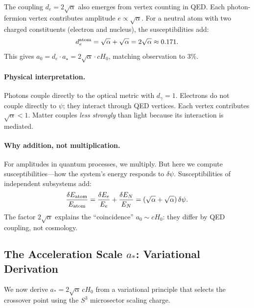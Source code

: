 \begin{remark}\label{rem:two-vertex}
The coupling $d_e = 2\sqrt{\alpha}$ also emerges from vertex counting in QED. Each photon-fermion vertex contributes amplitude $e \propto \sqrt{\alpha}$. For a neutral atom with two charged constituents (electron and nucleus), the susceptibilities add:
\begin{equation}
d_e^{\rm atom} = \sqrt{\alpha} + \sqrt{\alpha} = 2\sqrt{\alpha} \approx 0.171.
\end{equation}
This gives $a_0 = d_e \cdot a_\star = 2\sqrt{\alpha} \cdot cH_0$, matching observation to 3\%.

\paragraph{Physical interpretation.}
Photons couple directly to the optical metric with $d_\gamma = 1$. Electrons do not couple directly to $\psi$; they interact through QED vertices. Each vertex contributes $\sqrt{\alpha} < 1$. Matter couples \textit{less strongly} than light because its interaction is mediated.

\paragraph{Why addition, not multiplication.}
For amplitudes in quantum processes, we multiply. But here we compute susceptibilities---how the system's energy responds to $\delta\psi$. Susceptibilities of independent subsystems add:
\begin{equation}
\frac{\delta E_{\rm atom}}{E_{\rm atom}} = \frac{\delta E_e}{E_e} + \frac{\delta E_N}{E_N} = (\sqrt{\alpha} + \sqrt{\alpha})\,\delta\psi.
\end{equation}
The factor $2\sqrt{\alpha}$ explains the ``coincidence'' $a_0 \sim cH_0$: they differ by QED coupling, not cosmology.
\end{remark}

\subsection{The Acceleration Scale $a_*$: Variational Derivation}\label{app:astar-variational}

We now derive $a_* = 2\sqrt{\alpha}\,cH_0$ from a variational principle that selects the crossover point using the $S^3$ microsector scaling charge.

